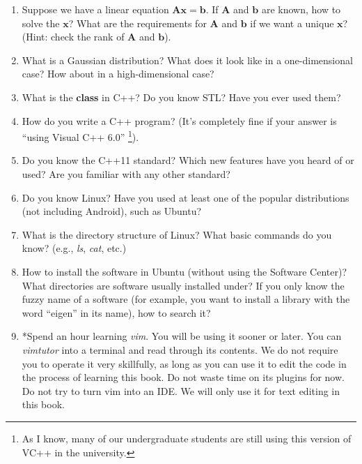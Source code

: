 \begin{English}
    \begin{enumerate}
    	\item Suppose we have a linear equation $\mathbf{Ax}=\mathbf{b}$. If $\mathbf{A}$ and $\mathbf{b}$ are known, how to solve the $\mathbf{x}$? What are the requirements for $\mathbf{A}$ and $\mathbf{b}$ if we want a unique $\mathbf{x}$? (Hint: check the rank of $\mathbf{A}$ and $\mathbf{b}$).
    
    	\item What is a Gaussian distribution? What does it look like in a one-dimensional case? How about in a high-dimensional case?
    
    	\item What is the \textbf{class} in C++? Do you know STL? Have you ever used them?
    
    	\item How do you write a C++ program? (It's completely fine if your answer is ``using Visual C++ 6.0'' \footnote{As I know, many of our undergraduate students are still using this version of VC++ in the university. }).
    
    	\item Do you know the C++11 standard? Which new features have you heard of or used? Are you familiar with any other standard?
    
    	\item Do you know Linux? Have you used at least one of the popular distributions (not including Android), such as Ubuntu?
    
    	\item What is the directory structure of Linux? What basic commands do you know? (e.g., \textit{ls}, \textit{cat}, etc.)
    
    	\item How to install the software in Ubuntu (without using the Software Center)? What directories are software usually installed under? If you only know the fuzzy name of a software (for example, you want to install a library with the word ``eigen'' in its name), how to search it?
    
    	\item *Spend an hour learning \textit{vim}. You will be using it sooner or later. You can \textit{vimtutor} into a terminal and read through its contents. We do not require you to operate it very skillfully, as long as you can use it to edit the code in the process of learning this book. Do not waste time on its plugins for now. Do not try to turn vim into an IDE. We will only use it for text editing in this book.
    
    \end{enumerate}
\end{English}

